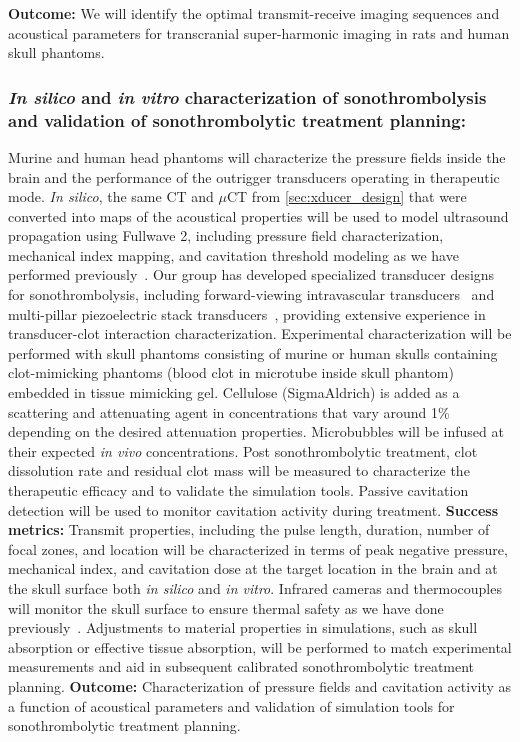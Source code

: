  \textbf{Outcome:} We will identify the optimal transmit-receive imaging sequences and acoustical parameters for transcranial super-harmonic imaging in rats and human skull phantoms.
 
\subsubsection{\textit{In silico} and \textit{in vitro} characterization of sonothrombolysis and validation of sonothrombolytic treatment planning: \label{sec:thermal_validation}} Murine and human head phantoms will characterize the pressure fields inside the brain and the performance of the outrigger transducers operating in therapeutic mode. \textit{In silico}, the same CT and $\mu$CT from \ref{sec:xducer_design} that were converted into maps of the acoustical properties will be used to model ultrasound propagation using Fullwave 2, including pressure field characterization, mechanical index mapping, and cavitation threshold modeling as we have performed previously~\cite{zhao2005two,pinton2011attenuation,pinton2011cavitation,pinton2009phase}. Our group has developed specialized transducer designs for sonothrombolysis, including forward-viewing intravascular transducers~\cite{kim2017intravascular,goel2021safety} and multi-pillar piezoelectric stack transducers~\cite{kim2021multi}, providing extensive experience in transducer-clot interaction characterization. Experimental characterization will be performed with skull phantoms consisting of murine or human skulls containing clot-mimicking phantoms (blood clot in microtube inside skull phantom) embedded in tissue mimicking gel. Cellulose (SigmaAldrich) is added as a scattering and attenuating agent in concentrations that vary around 1\% depending on the desired attenuation properties.
Microbubbles will be infused at their expected \textit{in vivo} concentrations. Post sonothrombolytic treatment, clot dissolution rate and residual clot mass will be measured to characterize the therapeutic efficacy and to validate the simulation tools. Passive cavitation detection will be used to monitor cavitation activity during treatment.
\textbf{Success metrics:} Transmit properties, including the pulse length, duration, number of focal zones, and location will be characterized in terms of peak negative pressure, mechanical index, and cavitation dose at the target location in the brain and at the skull surface both \textit{in silico} and \textit{in vitro}. Infrared cameras and thermocouples will monitor the skull surface to ensure thermal safety as we have done previously~\cite{pinton2011attenuation}. Adjustments to material properties in simulations, such as skull absorption or effective tissue absorption, will be performed to match experimental measurements and aid in subsequent calibrated sonothrombolytic treatment planning. \textbf{Outcome:} Characterization of pressure fields and cavitation activity as a function of acoustical parameters and validation of simulation tools for sonothrombolytic treatment planning.

